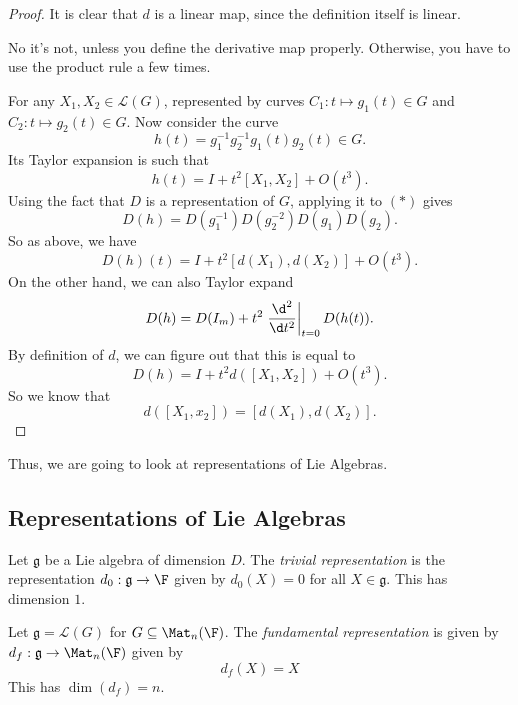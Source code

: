 \documentclass[a4paper]{article}
\begin{document}
\begin{proof}
  It is clear that $d$ is a linear map, since the definition itself is linear. \begin{own}No it's not, unless you define the derivative map properly. Otherwise, you have to use the product rule a few times.\end{own}

  For any $X_1, X_2 \in \mathcal{L}(G)$, represented by curves $C_1: t \mapsto g_1(t) \in G$ and $C_2: t \mapsto g_2(t) \in G$. Now consider the curve
  \[
    h(t) = g_1^{-1} g_2^{-1}g_1(t)g_2(t) \in G.\tag{$*$}
  \]
  Its Taylor expansion is such that
  \[
    h(t) = I + t^2 [X_1, X_2] + O(t^3).
  \]
  Using the fact that $D$ is a representation of $G$, applying it to $(*)$ gives
  \[
    D(h) = D(g_1^{-1}) D(g_2^{-2}) D(g_1) D(g_2).
  \]
  So as above, we have
  \[
    D(h)(t) = I + t^2 [d(X_1), d(X_2)] + O(t^3).
  \]
  On the other hand, we can also Taylor expand
  \[
    D(h) = D(I_m) + t^2 \left.\frac{\d^2}{\d t^2}\right|_{t = 0} D(h(t)).
  \]
  By definition of $d$, we can figure out that this is equal to
  \[
    D(h) = I + t^2 d([X_1, X_2]) + O(t^3).
  \]
  So we know that
  \[
    d([X_1, x_2]) = [d(X_1), d(X_2)].
  \]
\end{proof}

Thus, we are going to look at representations of Lie Algebras.

\subsection{Representations of Lie Algebras}
\begin{defi}
  Let $\mathfrak{g}$ be a Lie algebra of dimension $D$. The \emph{trivial representation} is the representation $d_0: \mathfrak{g} \to \F$ given by $d_0(X) = 0$ for all $X \in \mathfrak{g}$. This has dimension $1$.
\end{defi}

\begin{defi}
  Let $\mathfrak{g} = \mathcal{L}(G)$ for $G \subseteq \Mat_n(\F)$. The \emph{fundamental representation} is given by $d_f: \mathfrak{g} \to \Mat_n(\F)$ given by
  \[
    d_f (X) = X
  \]
  This has $\dim (d_f) = n$.
\end{defi}
\end{document}
